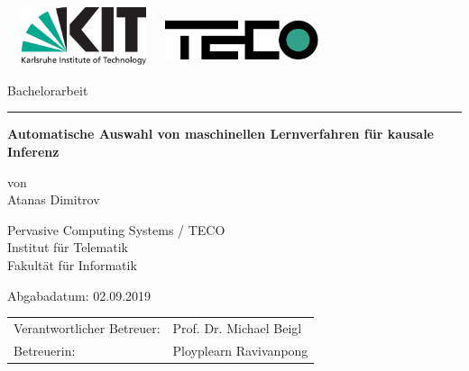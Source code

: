 \documentclass[12pt,a4paper,twoside]{scrartcl}
\numberwithin{equation}{section}
\begin{document}
\boldmath
\nonfrenchspacing

\pagestyle{empty}


\setlength{\parindent}{4em}
\setlength{\parskip}{1em}

\begin{titlepage}

  \begin{center}\large

    {\flushleft\includegraphics[height=17mm, width=45mm]{kit_logo_en.pdf} \hfill}
    \includegraphics[height=15mm, width=45mm]{group_logo.pdf}\quad\null

    \vspace*{1cm}
    {\Large Bachelorarbeit}\\
    \noindent\hfil\rule{0.4\textwidth}{.4pt}\hfil
    \vspace*{1cm}

    {\bf\huge Automatische Auswahl von maschinellen Lernverfahren für kausale Inferenz\par}
    \vspace*{5mm}

    von\\
    \vspace*{3mm}
    {\huge{Atanas Dimitrov}}

    \vspace*{10mm}
    Pervasive Computing Systems / TECO\\
    Institut für Telematik\\
	Fakultät für Informatik\\
   
    \vspace*{15mm}

   	Abgabadatum: 02.09.2019 %
    \vspace*{10mm}


    \begin{tabular}{p{8cm}l}
     Verantwortlicher Betreuer: &Prof. Dr. Michael Beigl\\
     Betreuerin: &Ployplearn Ravivanpong\\  
    \end{tabular}

    \vspace*{8mm}

  \end{center}

\end{titlepage}
\end{document}
